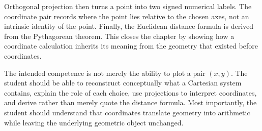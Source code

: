 Orthogonal projection then turns a point into two signed numerical labels. The
coordinate pair records where the point lies relative to the chosen axes, not an
intrinsic identity of the point. Finally, the Euclidean distance formula is
derived from the Pythagorean theorem. This closes the chapter by showing how a
coordinate calculation inherits its meaning from the geometry that existed
before coordinates.

The intended competence is not merely the ability to plot a pair $(x,y)$. The
student should be able to reconstruct conceptually what a Cartesian system
contains, explain the role of each choice, use projections to interpret
coordinates, and derive rather than merely quote the distance formula. Most
importantly, the student should understand that coordinates translate geometry
into arithmetic while leaving the underlying geometric object unchanged.
